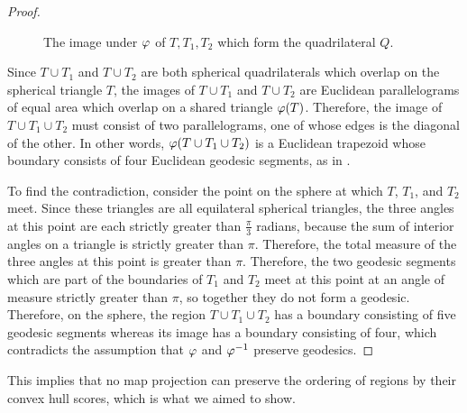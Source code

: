 \begin{proof}
		\begin{figure}[h]
			\centering
			
			\caption{The image under $\varphi$ of $T,T_1,T_2$ which form the quadrilateral $Q$.}
			\label{fig:sphtris_pl}
		\end{figure}
		

Since $T\cup T_1$ and $T\cup T_2$ are both spherical quadrilaterals which overlap on the spherical triangle $T$, the images of $T\cup T_1$ and $T\cup T_2$ are Euclidean parallelograms of equal area which overlap on a shared triangle $\varphi(T)$.
	Therefore, the image of $T\cup T_1\cup T_2$ must 
	consist of two parallelograms, one of whose 
	edges is the diagonal of the other. In other words, 
	$\varphi(T\cup T_1\cup T_2)$ is a Euclidean trapezoid 
	whose boundary consists of four Euclidean geodesic 
	segments, as in .
	
	To find the contradiction, consider the point on the sphere at which $T$, $T_1$, and $T_2$ meet.  Since these triangles are all equilateral spherical triangles, the three angles at this point are each strictly greater than $\tfrac{\pi}{3}$ radians, because the sum of interior angles on a triangle is strictly greater than $\pi$.  Therefore, the total measure of the three angles at this point is greater than $\pi$.  Therefore, the two geodesic segments which are part of the boundaries of $T_1$ and $T_2$ meet at this point at an angle of measure strictly greater than $\pi$, so together they do not form a geodesic.  Therefore, on the sphere, the region $T\cup T_1\cup T_2$ has a boundary consisting of five geodesic segments whereas its image has a boundary consisting of four, which contradicts the assumption that $\varphi$ and $\varphi^{-1}$ preserve geodesics.
\end{proof}

This implies that no map projection can preserve the ordering of regions by their convex hull scores, which is what we aimed to show.
